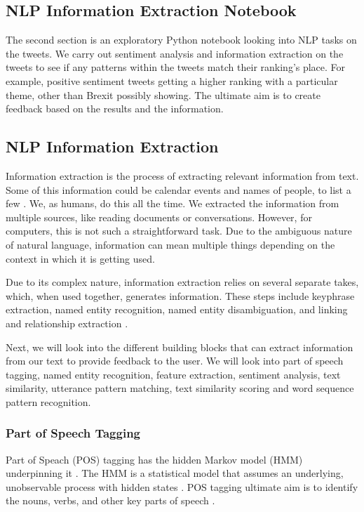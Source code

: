 	\subsection{NLP Information Extraction Notebook}
	
	The second section is an exploratory Python notebook looking into NLP tasks on the tweets. We carry out sentiment analysis and information extraction on the tweets to see if any patterns within the tweets match their ranking's place. For example, positive sentiment tweets getting a higher ranking with a particular theme, other than Brexit possibly showing. The ultimate aim is to create feedback based on the results and the information. %
	
	\subsection{NLP Information Extraction}
	\label{meth:nlp_IE}
	Information extraction is the process of extracting relevant information from text. Some of this information could be calendar events and names of people, to list a few \cite{vajjala2020practical}. We, as humans, do this all the time. We extracted the information from multiple sources, like reading documents or conversations. However, for computers, this is not such a straightforward task. Due to the ambiguous nature of natural language, information can mean multiple things depending on the context in which it is getting used.
	
	Due to its complex nature, information extraction relies on several separate takes, which, when used together, generates information. These steps include keyphrase extraction, named entity recognition, named entity disambiguation, and linking and relationship extraction \cite{vajjala2020practical}.
	
	Next, we will look into the different building blocks that can extract information from our text to provide feedback to the user. We will look into part of speech tagging, named entity recognition, feature extraction, sentiment analysis, text similarity, utterance pattern matching, text similarity scoring and word sequence pattern recognition.
	
	\subsubsection{Part of Speech Tagging}
	Part of Speach (POS) tagging has the hidden Markov model (HMM) underpinning it \cite{vajjala2020practical}. The HMM is a statistical model that assumes an underlying, unobservable process with hidden states \cite{baum1966statistical}. POS tagging ultimate aim is to identify the nouns, verbs, and other key parts of speech \cite{vasiliev2020natural}.
	
